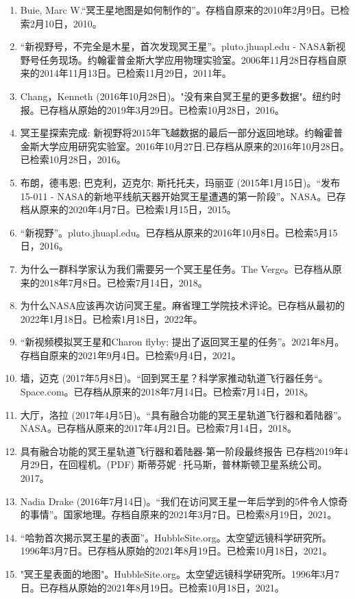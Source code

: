 \begin{enumerate}
\item Buie, Marc W.“冥王星地图是如何制作的”。存档自原来的2010年2月9日。已检索2月10日，2010。
\item “新视野号，不完全是木星，首次发现冥王星”。pluto.jhuapl.edu - NASA新视野号任务现场。约翰霍普金斯大学应用物理实验室。2006年11月28日存档自原来的2014年11月13日。已检索11月29日，2011年。
\item Chang，Kenneth (2016年10月28日)。"没有来自冥王星的更多数据"。纽约时报。已存档从原始的2019年3月29日。已检索10月28日，2016。
\item 冥王星探索完成: 新视野将2015年飞越数据的最后一部分返回地球。约翰霍普金斯大学应用研究实验室。2016年10月27日.已存档从原来的2016年10月28日。已检索10月28日，2016。
\item 布朗，德韦恩; 巴克利，迈克尔; 斯托托夫，玛丽亚 (2015年1月15日)。“发布15-011 - NASA的新地平线航天器开始冥王星遭遇的第一阶段”。NASA。已存档从原来的2020年4月7日。已检索1月15日，2015。
\item “新视野”。pluto.jhuapl.edu。已存档从原来的2016年10月8日。已检索5月15日，2016。
\item 为什么一群科学家认为我们需要另一个冥王星任务。The Verge。已存档从原来的2018年7月8日。已检索7月14日，2018。
\item 为什么NASA应该再次访问冥王星。麻省理工学院技术评论。已存档从最初的2022年1月18日。已检索1月18日，2022年。
\item “新视频模拟冥王星和Charon flyby; 提出了返回冥王星的任务”。2021年8月。存档自原来的2021年9月4日。已检索9月4日，2021。
\item 墙，迈克 (2017年5月8日)。“回到冥王星？科学家推动轨道飞行器任务“。Space.com。已存档从原来的2018年7月14日。已检索7月14日，2018。
\item 大厅，洛拉 (2017年4月5日)。“具有融合功能的冥王星轨道飞行器和着陆器”。NASA。已存档从原来的2017年4月21日。已检索7月14日，2018。
\item 具有融合功能的冥王星轨道飞行器和着陆器-第一阶段最终报告 已存档2019年4月29日，在回程机。(PDF) 斯蒂芬妮·托马斯，普林斯顿卫星系统公司。2017。
\item Nadia Drake (2016年7月14日)。“我们在访问冥王星一年后学到的5件令人惊奇的事情”。国家地理。存档自原来的2021年3月7日。已检索8月19日，2021。
\item “哈勃首次揭示冥王星的表面”。HubbleSite.org。太空望远镜科学研究所。1996年3月7日。已存档从原始的2021年8月19日。已检索10月18日，2021。
\item "冥王星表面的地图"。HubbleSite.org。太空望远镜科学研究所。1996年3月7日。已存档从原始的2021年8月19日。已检索10月18日，2021。

\end{enumerate}

